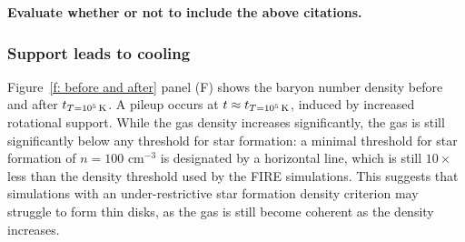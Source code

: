 \documentclass[fleqn,usenatbib]{mnras}
\newcommand{\Rcon}{R_{T=10^5\,{\rm K}}}
\newcommand{\tcon}{t_{T=10^5\,{\rm K}}}
\begin{document}
\textbf{Evaluate whether or not to include the above citations.}



\subsubsection{Support leads to cooling}
\label{s: mechanics -- energy balance}

Figure~\ref{f: before and after} panel (F) shows the baryon number density before and after $\tcon$.
A pileup occurs at $t\approx \tcon$, induced by increased rotational support.
While the gas density increases significantly, the gas is still significantly below any threshold for star formation:
a minimal threshold for star formation of $n = 100$ cm$^{-3}$ is designated by a horizontal line, which is still $10\times$ less than the density threshold used by the FIRE simulations.
This suggests that simulations with an under-restrictive star formation density criterion may struggle to form thin disks, as the gas is still become coherent as the density increases.
\end{document}
